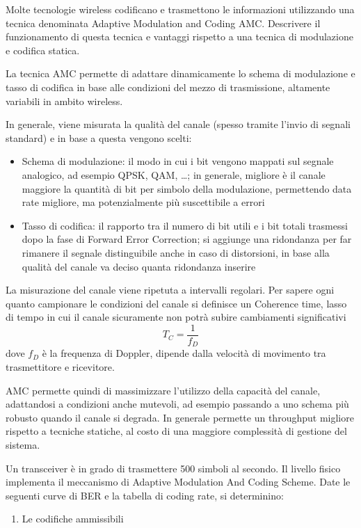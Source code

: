\begin{questions}
    \question Molte tecnologie wireless codificano e trasmettono le informazioni utilizzando una tecnica denominata Adaptive Modulation and Coding AMC. Descrivere il funzionamento di questa tecnica e vantaggi rispetto a una tecnica di modulazione e codifica statica.
    
    \begin{solution}
        La tecnica AMC permette di adattare dinamicamente lo schema di modulazione e tasso di codifica in base alle condizioni del mezzo di trasmissione, altamente variabili in ambito wireless.
        
        In generale, viene misurata la qualità del canale (spesso tramite l'invio di segnali standard) e in base a questa vengono scelti: 
        \begin{itemize}
            \item Schema di modulazione: il modo in cui i bit vengono mappati sul segnale analogico, ad esempio QPSK, QAM, \dots; in generale, migliore è il canale maggiore la quantità di bit per simbolo della modulazione, permettendo data rate migliore, ma potenzialmente più suscettibile a errori
            
            \item Tasso di codifica: il rapporto tra il numero di bit utili e i bit totali trasmessi dopo la fase di Forward Error Correction; si aggiunge una ridondanza per far rimanere il segnale distinguibile anche in caso di distorsioni, in base alla qualità del canale va deciso quanta ridondanza inserire
        \end{itemize}
        
        La misurazione del canale viene ripetuta a intervalli regolari. Per sapere ogni quanto campionare le condizioni del canale si definisce un Coherence time, lasso di tempo in cui il canale sicuramente non potrà subire cambiamenti significativi
        $$ T_C = \frac{1}{f_D}$$
        dove $f_D$ è la frequenza di Doppler, dipende dalla velocità di movimento tra trasmettitore e ricevitore.
        
        AMC permette quindi di massimizzare l'utilizzo della capacità del canale, adattandosi a condizioni anche mutevoli, ad esempio passando a uno schema più robusto quando il canale si degrada. In generale permette un throughput migliore rispetto a tecniche statiche, al costo di una maggiore complessità di gestione del sistema.
    \end{solution}
    
    \question Un transceiver è in grado di trasmettere 500 simboli al secondo. Il livello fisico implementa il meccanismo di Adaptive Modulation And Coding Scheme. Date le seguenti curve di BER e la tabella di coding rate, si determinino: 
    \begin{enumerate}
        \item Le codifiche ammissibili
        

\end{enumerate}
\end{questions}

